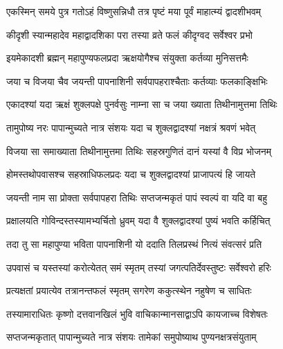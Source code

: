\label{sec:padma-margashirsha-krishna-utpanna}

\ganapatyadiDhyanam
\padmaPuranam


\twolineshloka
{एकस्मिन् समये पुत्र गतोऽहं विष्णुसन्निधौ}
{तत्र पृष्टं मया पूर्वं माहात्म्यं द्वादशीभवम्}%


\twolineshloka
{कीदृशी स्यान्महादेव महाद्वादशिका परा}
{तस्या व्रते फलं कीदृग्वद सर्वेश्वर प्रभो}%


\twolineshloka
{इयमेकादशी ब्रह्मन् महापुण्यफलप्रदा}
{ऋक्षयोगैश्च संयुक्ता कर्तव्या मुनिसत्तमैः}%

\twolineshloka
{जया च विजया चैव जयन्ती पापनाशिनी}
{सर्वपापहराश्चैताः कर्तव्याः फलकाङ्क्षिभिः}%

\twolineshloka
{एकादश्यां यदा ऋक्षं शुक्लपक्षे पुनर्वसुः}
{नाम्ना सा च जया ख्याता तिथीनामुत्तमा तिथिः}%

\twolineshloka
{तामुपोष्य नरः पापान्मुच्यते नात्र संशयः}
{यदा च शुक्लद्वादश्यां नक्षत्रं श्रवणं भवेत्}%

\twolineshloka
{विजया सा समाख्याता तिथीनामुत्तमा तिथिः}
{सहस्रगुणितं दानं यस्यां वै विप्र भोजनम्}%

\twolineshloka
{होमस्तथोपवासश्च सहस्राधिफलप्रदः}
{यदा च शुक्लद्वादश्यां प्राजापत्यं हि जायते}%

\twolineshloka
{जयन्ती नाम सा प्रोक्ता सर्वपापहरा तिथिः}
{सप्तजन्मकृतं पापं स्वल्पं वा यदि वा बहु}%

\twolineshloka
{प्रक्षालयति गोविन्दस्तस्यामभ्यर्चितो ध्रुवम्}
{यदा वै शुक्लद्वादश्यां पुष्यं भवति कर्हिचित्}%

\twolineshloka
{तदा तु सा महापुण्या भविता पापनाशिनी}
{यो ददाति तिलप्रस्थं नित्यं संवत्सरं प्रति}%

\twolineshloka
{उपवासं च यस्तस्यां करोत्येतत् समं स्मृतम्}
{तस्यां जगत्पतिर्देवस्तुष्टः सर्वेश्वरो हरिः}%

\twolineshloka
{प्रत्यक्षतां प्रयात्येव तत्रानन्तफलं स्मृतम्}
{सगरेण ककुत्स्थेन नहुषेण च साधितः}%

\twolineshloka
{तस्यामाराधितः कृष्णो दत्तवानखिलं भुवि}
{वाचिकान्मानसाद्वाऽपि कायजाच्च विशेषतः}%

\twolineshloka
{सप्तजन्मकृतात् पापान्मुच्यते नात्र संशयः}
{तामेकां समुपोष्याथ पुण्यनक्षत्रसंयुताम्}%

